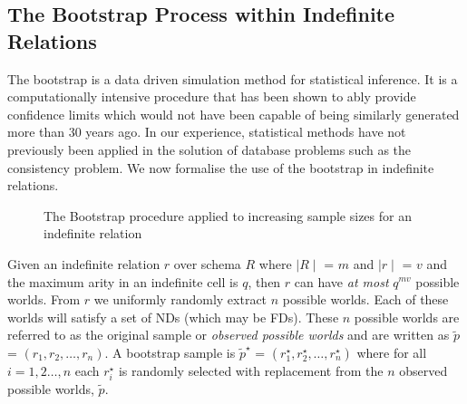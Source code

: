 \subsection{The Bootstrap Process within Indefinite Relations}

The bootstrap is a data driven simulation method for
statistical inference. It is a computationally intensive procedure
that has been shown to ably provide confidence limits which would not have
been capable of being similarly generated more than 30 years ago.
In our experience, statistical methods have not previously been 
applied in the solution of database problems such as the consistency problem.
We now formalise the use of the bootstrap in indefinite relations.
\medskip

\begin{figure}[ht]
\centerline{}
\caption{\label{fig:inc_boot} The Bootstrap procedure applied to
increasing sample sizes for an indefinite relation}
\end{figure}
\begin{definition}
\begin{rm}
Given an indefinite relation $r$ over schema $R$ where $\mid R \mid$ =
$m$ and $\mid r \mid$ = $v$ and the maximum arity in an
indefinite cell is $q$, then $r$ can have {\em at most} $q^{mv}$ possible
worlds.  From $r$ we uniformly randomly extract $n$ possible worlds.
Each of these worlds will satisfy a set of NDs (which may be FDs). These $n$ possible
worlds are referred to as the original sample or {\em observed possible 
worlds }
and are written as {\bf $\tilde{p}$} = $(r_1, r_2, \ldots, r_n)$. A
bootstrap sample is {\bf $\tilde{p}^\star$} = $(r_1^\star, r_2^\star, \ldots, r_n^\star )$ where for all $i = 1,2 \ldots, n$ each $r_i^\star$ is randomly
selected with replacement from the $n$ observed possible worlds,
{\bf $\tilde{p}$}.
\end{rm}
\end{definition}

